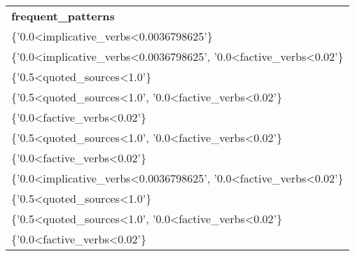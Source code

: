\begin{tabular}{ll}
\multicolumn{2}{l}{\textbf{frequent\_patterns}}                                                                                    \\
\multicolumn{2}{l}{\{'0.0\textless{}implicative\_verbs\textless{}0.0036798625'\}}                                                  \\
\multicolumn{2}{l}{\{'0.0\textless{}implicative\_verbs\textless{}0.0036798625',   '0.0\textless{}factive\_verbs\textless{}0.02'\}} \\
\multicolumn{2}{l}{\{'0.5\textless{}quoted\_sources\textless{}1.0'\}}                                                              \\
\multicolumn{2}{l}{\{'0.5\textless{}quoted\_sources\textless{}1.0',   '0.0\textless{}factive\_verbs\textless{}0.02'\}}             \\
\multicolumn{2}{l}{\{'0.0\textless{}factive\_verbs\textless{}0.02'\}}                                                              \\
\multicolumn{2}{l}{\{'0.5\textless{}quoted\_sources\textless{}1.0',   '0.0\textless{}factive\_verbs\textless{}0.02'\}}             \\
\multicolumn{2}{l}{\{'0.0\textless{}factive\_verbs\textless{}0.02'\}}                                                              \\
\multicolumn{2}{l}{\{'0.0\textless{}implicative\_verbs\textless{}0.0036798625',   '0.0\textless{}factive\_verbs\textless{}0.02'\}} \\
\multicolumn{2}{l}{\{'0.5\textless{}quoted\_sources\textless{}1.0'\}}                                                              \\
\multicolumn{2}{l}{\{'0.5\textless{}quoted\_sources\textless{}1.0',   '0.0\textless{}factive\_verbs\textless{}0.02'\}}             \\
\multicolumn{2}{l}{\{'0.0\textless{}factive\_verbs\textless{}0.02'\}}                                                             
\end{tabular}